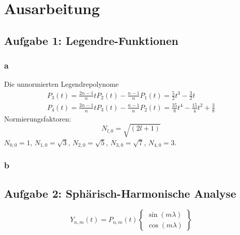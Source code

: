 \chapter{Ausarbeitung}
\section{Aufgabe 1: Legendre-Funktionen}
\subsection{a}
Die unnormierten Legendrepolynome
\begin{gather}
	P_3(t) = \frac{2n-1}{n} t P_2(t) - \frac{n-1}{n}P_1(t) = \frac{5}{2}t^3-\frac{3}{2}t \\
	P_4(t) = \frac{2n-1}{n} t P_3(t) - \frac{n-1}{n}P_2(t) = \frac{35}{8}t^4 - \frac{15}{4}t^2 + \frac{3}{8}
\end{gather}
Normierungsfaktoren:
\begin{equation}
	N_{l,0} = \sqrt{(2l+1)}	
\end{equation}
$N_{0,0} = 1$, $N_{1,0} = \sqrt{3}$, $N_{2,0} = \sqrt{5}$, $N_{3,0} = \sqrt{7}$, $N_{4,0} = 3$.
\subsection{b}

\clearpage
\section{Aufgabe 2: Sphärisch-Harmonische Analyse}
\begin{equation}
	Y_{n,m}(t) = P_{n,m}(t) \begin{Bmatrix}
	\sin(m\lambda) \\
	\cos(m \lambda)
	\end{Bmatrix}
\end{equation}
